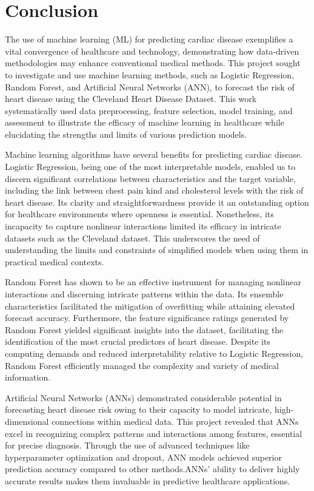 \section{Conclusion}

The use of machine learning (ML) for predicting cardiac disease exemplifies a vital convergence of healthcare and technology, demonstrating how data-driven methodologies may enhance conventional medical methods. This project sought to investigate and use machine learning methods, such as Logistic Regression, Random Forest, and Artificial Neural Networks (ANN), to forecast the risk of heart disease using the Cleveland Heart Disease Dataset. This work systematically used data preprocessing, feature selection, model training, and assessment to illustrate the efficacy of machine learning in healthcare while elucidating the strengths and limits of various prediction models.

Machine learning algorithms have several benefits for predicting cardiac disease. Logistic Regression, being one of the most interpretable models, enabled us to discern significant correlations between characteristics and the target variable, including the link between chest pain kind and cholesterol levels with the risk of heart disease. Its clarity and straightforwardness provide it an outstanding option for healthcare environments where openness is essential. Nonetheless, its incapacity to capture nonlinear interactions limited its efficacy in intricate datasets such as the Cleveland dataset. This underscores the need of understanding the limits and constraints of simplified models when using them in practical medical contexts.

Random Forest has shown to be an effective instrument for managing nonlinear interactions and discerning intricate patterns within the data. Its ensemble characteristics facilitated the mitigation of overfitting while attaining elevated forecast accuracy. Furthermore, the feature significance ratings generated by Random Forest yielded significant insights into the dataset, facilitating the identification of the most crucial predictors of heart disease. Despite its computing demands and reduced interpretability relative to Logistic Regression, Random Forest efficiently managed the complexity and variety of medical information.

Artificial Neural Networks (ANNs) demonstrated considerable potential in forecasting heart disease risk owing to their capacity to model intricate, high-dimensional connections within medical data. This project revealed that ANNs excel in recognizing complex patterns and interactions among features, essential for precise diagnosis. Through the use of advanced techniques like hyperparameter optimization and dropout, ANN models achieved superior prediction accuracy compared to other methods.ANNs’ ability to deliver highly accurate results makes them invaluable in predictive healthcare applications.

